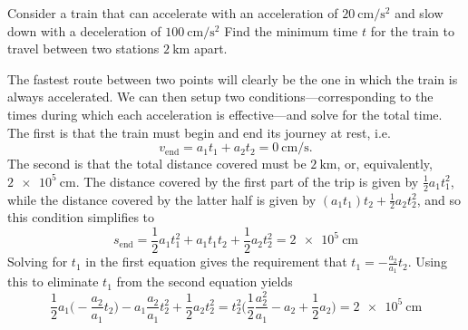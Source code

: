\documentclass[../feynman-lectures-on-physics.tex]{subfiles}
\begin{document}
\begin{questions}
\begin{solution}
  \end{solution}

	\question Consider a train that can accelerate with an acceleration of $\SI{20}{\centi\meter\per\second\squared}$ and slow down with a deceleration of $\SI{100}{\centi\meter\per\second\squared}$ Find the minimum time $t$ for the train to travel between two stations $\SI{2}{\kilo\meter}$ apart.
    
  \begin{solution}
    The fastest route between two points will clearly be the one in which the
    train is always accelerated. We can then setup two conditions---corresponding
    to the times during which each acceleration is effective---and solve for the
    total time. The first is that the train must
    begin and end its journey at rest, i.e.
      \[
      v_{\text{end}} = a_1t_1 + a_2t_2 = \SI{0}{\centi\meter\per\second}.
      \]
    The second is that the total distance covered must be $\SI{2}{\kilo\meter}$,
    or, equivalently, $\SI{2e5}{\centi\meter}$. The distance covered by the first
    part of the trip is given by $\frac{1}{2}a_1t_1^2$, while the distance covered
    by the latter half is given by $(a_1t_1)t_2 + \frac{1}{2}a_2t_2^2$, and so this
    condition simplifies to
    \[
    s_{\text{end}}=\frac{1}{2}a_1t_1^2 + a_1t_1t_2 + \frac{1}{2}a_2t_2^2 = \SI{2e5}{\centi\meter}
    \]
    Solving for $t_1$ in the first equation gives the requirement that $t_1 =
    -\frac{a_2}{a_1}t_2$. Using this to eliminate $t_1$ from the second equation
    yields
    \[
    \frac{1}{2}a_1\Big(-\frac{a_2}{a_1}t_2\Big) -
    a_1\frac{a_2}{a_1}t_2^2+\frac{1}{2}a_2t_2^2 =
    t_2^2\Big(\frac{1}{2}\frac{a_2^2}{a_1} - a_2 + \frac{1}{2}a_2\Big) = \SI{2e5}{\centi\meter}
    \]


\end{solution}
\end{questions}
\end{document}
